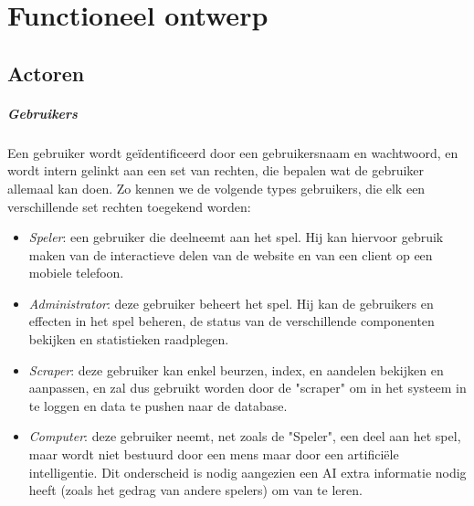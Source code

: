 %
%

\chapter{Functioneel ontwerp}

\section{Actoren}

\paragraph{Gebruikers}Een gebruiker wordt ge\"identificeerd door een gebruikersnaam en wachtwoord, en wordt intern gelinkt aan een set van rechten, die bepalen wat de gebruiker allemaal kan doen. Zo kennen we de volgende types gebruikers, die elk een verschillende set rechten toegekend worden:
\begin{itemize}
	\item{\emph{Speler}: een gebruiker die deelneemt aan het spel. Hij kan hiervoor gebruik maken van de interactieve delen van de website en van een client op een mobiele telefoon.}
	\item{\emph{Administrator}: deze gebruiker beheert het spel. Hij kan de gebruikers en effecten in het spel beheren, de status van de verschillende componenten bekijken en statistieken raadplegen.}
	\item{\emph{Scraper}: deze gebruiker kan enkel beurzen, index, en aandelen bekijken en aanpassen, en zal dus gebruikt worden door de "scraper" om in het systeem in te loggen en data te pushen naar de database.}
	\item{\emph{Computer}: deze gebruiker neemt, net zoals de "Speler", een deel aan het spel, maar wordt niet bestuurd door een mens maar door een artifici\"ele intelligentie. Dit onderscheid is nodig aangezien een AI extra informatie nodig heeft (zoals het gedrag van andere spelers) om van te leren.}
\end{itemize}

